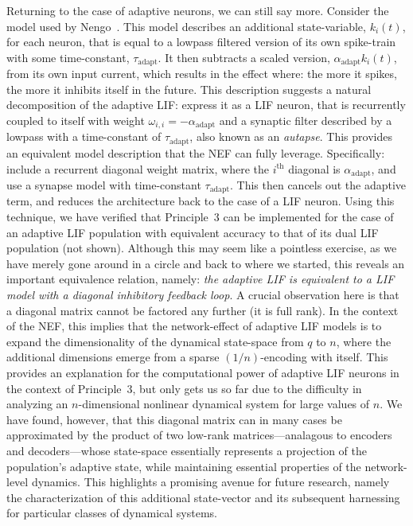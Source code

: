 Returning to the case of adaptive neurons, we can still say more.
Consider the model used by Nengo~\citep{camera2004minimal}.
This model describes an additional state-variable, $k_i(t)$, for each neuron, that is equal to a lowpass filtered version of its own spike-train with some time-constant, $\tau_\text{adapt}$.
It then subtracts a scaled version, $\alpha_\text{adapt} k_i(t)$, from its own input current, which results in the effect where: the more it spikes, the more it inhibits itself in the future.
This description suggests a natural decomposition of the adaptive LIF: express it as a LIF neuron, that is recurrently coupled to itself with weight $\omega_{i,i} = -\alpha_\text{adapt}$ and a synaptic filter described by a lowpass with a time-constant of $\tau_\text{adapt}$, also known as an \emph{autapse}.
This provides an equivalent model description that the NEF can fully leverage.
Specifically: include a recurrent diagonal weight matrix, where the $i^\text{th}$ diagonal is $\alpha_\text{adapt}$, and use a synapse model with time-constant $\tau_\text{adapt}$.
This then cancels out the adaptive term, and reduces the architecture back to the case of a LIF neuron.
Using this technique, we have verified that Principle~3 can be implemented for the case of an adaptive LIF population with equivalent accuracy to that of its dual LIF population (not shown).
Although this may seem like a pointless exercise, as we have merely gone around in a circle and back to where we started, this reveals an important equivalence relation, namely:
\emph{the adaptive LIF is equivalent to a LIF model with a diagonal inhibitory feedback loop}.
A crucial observation here is that a diagonal matrix cannot be factored any further (it is full rank).
In the context of the NEF, this implies that the network-effect of adaptive LIF models is to expand the dimensionality of the dynamical state-space from $q$ to $n$, where the additional dimensions emerge from a sparse $(1/n)$-encoding with itself.
This provides an explanation for the computational power of adaptive LIF neurons in the context of Principle~3, but only gets us so far due to the difficulty in analyzing an $n$-dimensional nonlinear dynamical system for large values of $n$.
We have found, however, that this diagonal matrix can in many cases be approximated by the product of two low-rank matrices---analagous to encoders and decoders---whose state-space essentially represents a projection of the population's adaptive state, while maintaining essential properties of the network-level dynamics.
This highlights a promising avenue for future research, namely the characterization of this additional state-vector and its subsequent harnessing for particular classes of dynamical systems.

